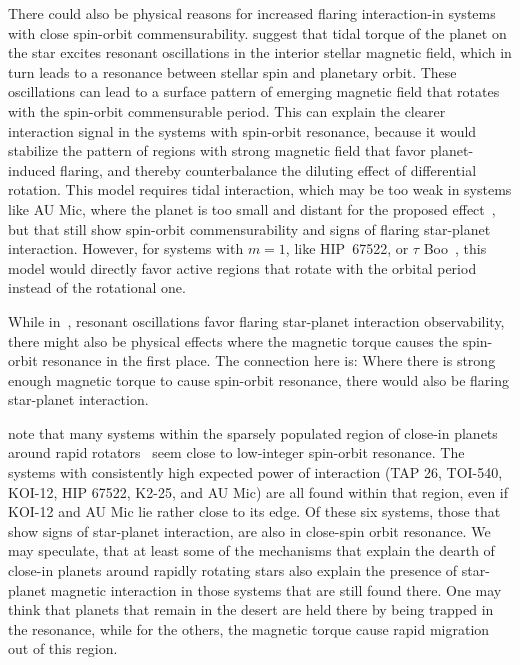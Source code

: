 \documentclass[twocolumn]{aastex631}
\begin{document}
There could also be physical reasons for increased flaring interaction-in systems with close spin-orbit commensurability.  \citet{lanza2022model} suggest that tidal torque of the planet on the star excites resonant oscillations in the interior stellar magnetic field, which in turn leads to a resonance between stellar spin and planetary orbit. These oscillations can lead to a surface pattern of emerging magnetic field that rotates with the spin-orbit commensurable period. This can explain the clearer interaction signal in the systems with spin-orbit resonance, because it would stabilize the pattern of regions with strong magnetic field that favor planet-induced flaring, and thereby counterbalance the diluting effect of differential rotation. This model requires tidal interaction, which may be too weak in systems like AU Mic, where the planet is too small and distant for the proposed effect~\citet{lanza2022model}, but that still show spin-orbit commensurability and signs of flaring star-planet interaction. 
However, for systems with $m=1$, like HIP~67522, or $\tau$ Boo~\citep[which is not in our sample]{walker2008nature, cauley2019magnetic}, this model would directly favor active regions that rotate with the orbital period instead of the rotational one.

While in~\citet{lanza2022model}, resonant oscillations favor flaring star-planet interaction observability, there might also be physical effects where the magnetic torque causes the spin-orbit resonance in the first place. The connection here is: Where there is strong enough magnetic torque to cause spin-orbit resonance, there would also be flaring star-planet interaction. 

\citet{szabo2021changing} note that many systems within the sparsely populated region of close-in planets around rapid rotators~\citep{mcquillan2013stellar} seem close to low-integer spin-orbit resonance. The systems with consistently high expected power of interaction (TAP 26, TOI-540, KOI-12, HIP 67522, K2-25, and AU Mic) are all found within that region, even if KOI-12 and AU Mic lie rather close to its edge. Of these six systems, those that show signs of star-planet interaction, are also in close-spin orbit resonance. We may speculate, that at least some of the mechanisms that explain the dearth of close-in planets around rapidly rotating stars also explain the presence of star-planet magnetic interaction in those systems that are still found there. One may think that planets that remain in the desert are held there by being trapped in the resonance, while for the others, the magnetic torque cause rapid migration out of this region.
\end{document}
